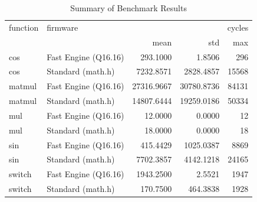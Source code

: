 \begin{table}[h!]
\centering
\caption{Summary of Benchmark Results}
\label{tab:benchmark_results}
\begin{tabular}{llrrr}
\toprule
function & firmware & \multicolumn{3}{r}{cycles} \\
 &  & mean & std & max \\
\midrule
cos & Fast Engine (Q16.16) & 293.1000 & 1.8506 & 296 \\
cos & Standard (math.h) & 7232.8571 & 2828.4857 & 15568 \\
matmul & Fast Engine (Q16.16) & 27316.9667 & 30780.8736 & 84131 \\
matmul & Standard (math.h) & 14807.6444 & 19259.0186 & 50334 \\
mul & Fast Engine (Q16.16) & 12.0000 & 0.0000 & 12 \\
mul & Standard (math.h) & 18.0000 & 0.0000 & 18 \\
sin & Fast Engine (Q16.16) & 415.4429 & 1025.0387 & 8869 \\
sin & Standard (math.h) & 7702.3857 & 4142.1218 & 24165 \\
switch & Fast Engine (Q16.16) & 1943.2500 & 2.5521 & 1947 \\
switch & Standard (math.h) & 170.7500 & 464.3838 & 1928 \\
\bottomrule
\end{tabular}
\end{table}
